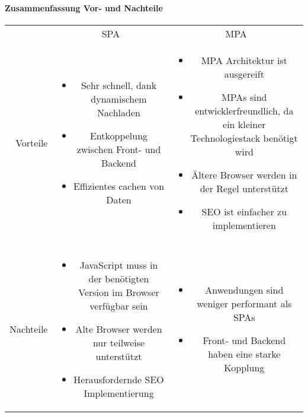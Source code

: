 \paragraph{Zusammenfassung Vor- und Nachteile} \label{para:Zusammenfassung_Vor-_und_Nachteile}
\mbox{} %
\begin{center}
	\begin{tabular}{rcc}
		& SPA & MPA \\
		Vorteile &
		\begin{minipage}[t]{0.4\textwidth}
			\begin{itemize}
				\item Sehr schnell, dank dynamischem Nachladen
				\item Entkoppelung zwischen Front- und Backend
				\item Effizientes cachen von Daten
			\end{itemize}
		\end{minipage} &
		\begin{minipage}[t]{0.4\textwidth}
			\begin{itemize}
				\item MPA Architektur ist ausgereift
				\item MPAs sind entwicklerfreundlich, da ein kleiner Technologiestack benötigt wird
				\item Ältere Browser werden in der Regel unterstützt
				\item SEO ist einfacher zu implementieren
			\end{itemize}
		\end{minipage}\\
		& & \\ %
		Nachteile &
		\begin{minipage}[t]{0.4\textwidth}
			\begin{itemize}
				\item JavaScript muss in der benötigten Version im Browser verfügbar sein
				\item Alte Browser werden nur teilweise unterstützt
				\item Herausfordernde SEO Implementierung
			\end{itemize}
		\end{minipage} &
		\begin{minipage}[t]{0.4\textwidth}
			\begin{itemize}
				\item Anwendungen sind weniger performant als SPAs
				\item Front- und Backend haben eine starke Kopplung
			\end{itemize}
		\end{minipage}
	
	\end{tabular}
\label{tab:Vor-_und_Nachteile_SPA/MPA}
\end{center}

